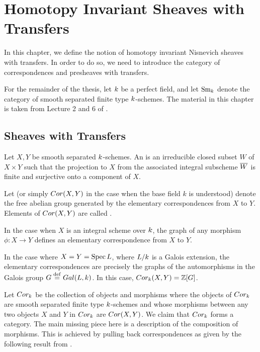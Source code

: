 \newpage
\chapter{Homotopy Invariant Sheaves with Transfers}\label{sect_hist}

In this chapter, we define the notion of homotopy invariant
Nisnevich sheaves with transfers. In order to do so, we need to
introduce the category of correspondences and presheaves with 
transfers. 

For the remainder of the thesis, let $k$ be a perfect 
field, and let $\mathrm{Sm}_{k}$ denote the category of smooth separated 
finite type $k$-schemes. The material in this chapter is 
taken from Lecture 2 and 6 of \cite{MVW}.

\section{Sheaves with Transfers}

\begin{defn}\label{def_cor}
  Let $X, Y$ be smooth separated $k$-schemes.  An
   is an irreducible
  closed subset $W$ of $X \times Y$ such that the projection to $X$
  from the associated integral subscheme $\overline{W}$ is finite and
  surjective onto a component of $X$.

  Let  (or simply $Cor(X, Y)$ in the
  case when the base field $k$ is understood) denote the free abelian
  group generated by the elementary correspondences from $X$ to
  $Y$. Elements of $Cor(X, Y)$ are called .
\end{defn}

\begin{ex}
In the case when $X$ is an integral scheme over $k$, the 
graph of any morphism $\phi: X \to Y$ defines an elementary 
correspondence from $X$ to $Y$. 

In the case where $X = Y = \mathrm{Spec}\, L$, where $L/k$ is a 
Galois extension, the elementary correspondences are precisely the 
graphs of the automorphisms in the Galois group $G \stackrel{\mathrm{def}}{=} Gal(L, 
k)$. In this case, $Cor_{k}(X, Y) = \mathbb{Z}[G]$.
\end{ex}

Let $Cor_{k}$ be the collection of objects and morphisms
where the objects of $Cor_k$ are smooth separated finite type
$k$-schemes and whose morphisms between any two objects $X$
and $Y$ in $Cor_k$ are $Cor(X, Y)$. We claim that
$Cor_{k}$ forms a category. The main missing piece here is a
description of the composition of morphisms. This is achieved by
pulling back correspondences as given by the following result from
\cite[1.7]{MVW}.

